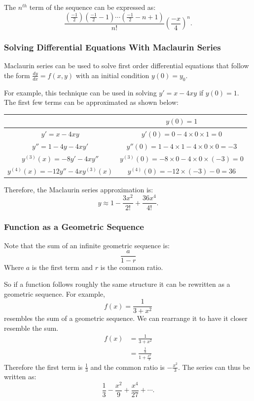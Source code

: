 \documentclass[12pt]{article}
\begin{document}
\noindent The $n^{th}$ term of the sequence can be expressed as:
\[ \frac{\left( \frac{-1}{2} \right) \left( \frac{-1}{2} - 1 \right) \cdots \left( \frac{-1}{2} - n + 1 \right)}{n!} \left( \frac{-x}{4} \right)^n. \]

\subsubsection{Solving Differential Equations With Maclaurin Series}

Maclaurin series can be used to solve first order differential equations that follow the form $\frac{dy}{dx} = f(x, y)$ with an initial condition $y(0) = y_0$.

For example, this technique can be used in solving $y' = x - 4xy$ if $y(0) = 1$. The first few terms can be approximated as shown below:

\begin{center}
	\begin{tabular}{|c|c|}
		\hline
		& $y(0) = 1$                                              \\
		\hline
		$y' = x - 4xy$                       & $y'(0) = 0 - 4 \times 0 \times 1 = 0$                   \\
		\hline
		$y'' = 1 - 4y - 4xy'$                & $y''(0) = 1 - 4 \times 1 - 4 \times 0 \times 0 = -3$    \\
		\hline
		$y^{(3)}(x) = -8y' - 4xy''$          & $y^{(3)}(0) = -8 \times 0 - 4 \times 0 \times (-3) = 0$ \\
		\hline
		$y^{(4)}(x) = -12y'' - 4xy^{(3)}(x)$ & $y^{(4)}(0) = -12 \times (-3) - 0 = 36$                 \\
		\hline
	\end{tabular}
\end{center}

\noindent Therefore, the Maclaurin series approximation is:
\[ y \approx 1 - \frac{3x^2}{2!} + \frac{36x^4}{4!}. \]

\subsubsection{Function as a Geometric Sequence}
\noindent Note that the sum of an infinite geometric sequence is:
\[ \frac{a}{1-r} \]
Where $a$ is the first term and $r$ is the common ratio.

\noindent So if a function follows roughly the same structure it can be rewritten as a geometric sequence. For example,
\[ f(x) = \frac{1}{3+x^2} \]
resembles the sum of a geometric sequence. We can rearrange it to have it closer resemble the sum.
\begin{align*}
	f(x) & = \frac{1}{3+x^2}                       \\[6pt]
	& = \frac{\frac{1}{3}}{1 + \frac{x^2}{3}}
\end{align*}
Therefore the first term is $\frac{1}{3}$ and the common ratio is $-\frac{x^2}{3}$. The series can thus be written as:
\[ \frac{1}{3} - \frac{x^2}{9} + \frac{x^4}{27} + \cdots. \]
\end{document}
